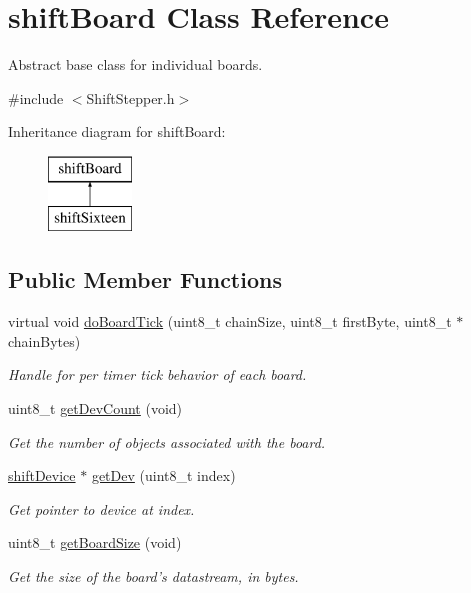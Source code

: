 \hypertarget{classshift_board}{
\section{shiftBoard Class Reference}
\label{classshift_board}
}


Abstract base class for individual boards.  




{\ttfamily \#include $<$ShiftStepper.h$>$}

Inheritance diagram for shiftBoard:\begin{figure}[H]
\begin{center}
\leavevmode
\includegraphics[height=2.000000cm]{classshift_board}
\end{center}
\end{figure}
\subsection*{Public Member Functions}
\begin{DoxyCompactItemize}
\item 
virtual void \hyperlink{classshift_board_a5a120f7aeb958c8e8fd0ec87eecc5798}{doBoardTick} (uint8\_\-t chainSize, uint8\_\-t firstByte, uint8\_\-t $\ast$chainBytes)
\begin{DoxyCompactList}\small\item\em Handle for per timer tick behavior of each board. \item\end{DoxyCompactList}\item 
uint8\_\-t \hyperlink{classshift_board_a7cf15ad074c5807b999bfcf490e2238a}{getDevCount} (void)
\begin{DoxyCompactList}\small\item\em Get the number of objects associated with the board. \item\end{DoxyCompactList}\item 
\hyperlink{classshift_device}{shiftDevice} $\ast$ \hyperlink{classshift_board_a0e47ab5a1c49478144a24342f34582d7}{getDev} (uint8\_\-t index)
\begin{DoxyCompactList}\small\item\em Get pointer to device at index. \item\end{DoxyCompactList}\item 
uint8\_\-t \hyperlink{classshift_board_ab60640025bb7557c57561a60bc97fc03}{getBoardSize} (void)
\begin{DoxyCompactList}\small\item\em Get the size of the board's datastream, in bytes. \item\end{DoxyCompactList}\end{DoxyCompactItemize}
